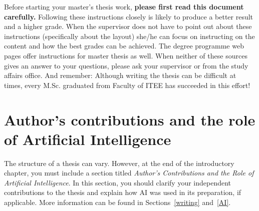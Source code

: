 Before starting your master’s thesis work, \textbf{please first read this document carefully.} Following these instructions closely is likely to produce a better result and a higher grade. When the supervisor does not have to point out about these instructions (specifically about the layout) she/he can focus on instructing on the content and how the best grades can be achieved. The degree programme web pages \cite{mscstudies} offer instructions for master thesis as well. When neither of these sources gives an answer to your questions, please ask your supervisor or from the study affairs office. And remember: Although writing the thesis can be difficult at times, every M.Sc. graduated from Faculty of ITEE has succeeded in this effort!

\section{Author's contributions and the role of Artificial Intelligence}

The structure of a thesis can vary. However, at the end of the introductory chapter, you must include a section titled \textit{Author's Contributions and the Role of Artificial Intelligence}. In this section, you should clarify your independent contributions to the thesis and explain how AI was used in its preparation, if applicable. More information can be found in Sections~\ref{writing} and~\ref{AI}.
